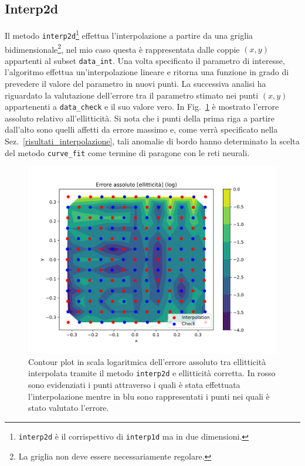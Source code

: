 \documentclass[12pt,a4paper,final]{book}
\begin{document}

\subsection{Interp2d}\label{interp2d}
Il metodo \texttt{interp2d}\footnote{\texttt{interp2d} è il corrispettivo di \texttt{interp1d} ma in due dimensioni.} effettua l'interpolazione a partire da una griglia bidimensionale\footnote{La griglia non deve essere necessariamente regolare.}, nel mio caso questa è rappresentata dalle coppie $(x,y)$ appartenti al subset \texttt{data\_int}. Una volta specificato il parametro di interesse, l'algoritmo effettua un'interpolazione lineare e ritorna una funzione in grado di prevedere il valore del parametro in nuovi punti.
La successiva analisi ha riguardato la valutazione dell'errore tra il parametro stimato nei punti $(x,y)$ appartenenti a \texttt{data\_check} e il suo valore vero. In Fig.~\ref{err_interp2d} è mostrato l'errore assoluto relativo all'ellitticità.
Si nota che i punti della prima riga a partire dall'alto sono quelli affetti da errore massimo e, come verrà specificato nella Sez.~\ref{risultati_interpolazione}, tali anomalie di bordo hanno determinato la scelta del metodo \texttt{curve\_fit} come termine di paragone con le reti neurali.
\begin{figure}[!ht]
	\centering
	\includegraphics[scale=0.6]{../figures/errore_assoluto_ell.png}
	\caption{Contour plot in scala logaritmica dell'errore assoluto tra ellitticità interpolata tramite il metodo \texttt{interp2d} e ellitticità corretta. In rosso sono evidenziati i punti attraverso i quali è stata effettuata l'interpolazione mentre in blu sono rappresentati i punti nei quali è stato valutato l'errore.}
	\label{err_interp2d}
\end{figure}
\end{document}
